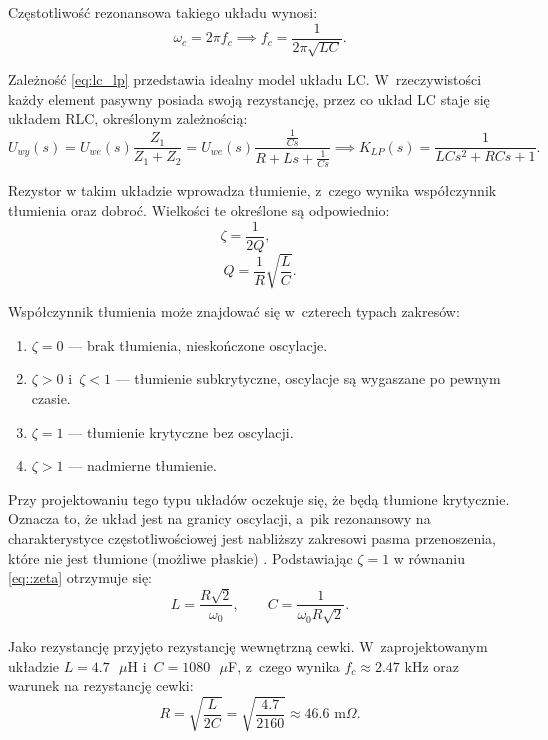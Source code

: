 Częstotliwość rezonansowa takiego układu wynosi:
\begin{equation}
    \omega_c = 2\pi f_c \implies f_c = \frac{1}{2\pi\sqrt{LC}}.
\end{equation}

Zależność \ref{eq:lc_lp} przedstawia idealny model układu LC. W~rzeczywistości
każdy element pasywny posiada swoją rezystancję, przez co układ LC staje się
układem RLC, określonym zależnością:
\begin{equation}
    U_{wy}(s) = U_{we}(s) \frac{Z_1}{Z_1 + Z_2} = U_{we}(s)\frac{\frac{1}{Cs}}{R + Ls + \frac{1}{Cs}}
        \implies K_{LP}(s) = \frac{1}{LCs^2 + RCs + 1}.
    \label{eq:lc_lp}
\end{equation}

Rezystor w takim układzie wprowadza tłumienie, z~czego wynika współczynnik
tłumienia oraz dobroć. Wielkości te określone są odpowiednio:
\begin{equation}
    \zeta = \frac{1}{2Q}, \qquad
    \label{eq::zeta}
\end{equation}
\begin{equation}
    Q = \frac{1}{R}\sqrt{\frac{L}{C}}.
\end{equation}

Współczynnik tłumienia może znajdować się w~czterech typach zakresów:
\begin{enumerate}
    \item $\zeta = 0$ --- brak tłumienia, nieskończone oscylacje.
    \item $\zeta > 0$ i~$\zeta < 1$ --- tłumienie subkrytyczne, oscylacje są
    wygaszane po pewnym czasie.
    \item $\zeta = 1$ --- tłumienie krytyczne bez oscylacji.
    \item $\zeta > 1$ --- nadmierne tłumienie.
\end{enumerate}

Przy projektowaniu tego typu układów oczekuje się, że będą tłumione krytycznie.
Oznacza to, że układ jest na granicy oscylacji, a~pik rezonansowy na
charakterystyce częstotliwościowej jest nabliższy zakresowi pasma przenoszenia,
które nie jest tłumione (możliwe płaskie) \cite{bib:lc}. Podstawiając $\zeta =
1$ w równaniu \ref{eq::zeta} otrzymuje się:
\begin{equation}
    L = \frac{R\sqrt{2}}{\omega_0}, \qquad 
    C = \frac{1}{\omega_0 R\sqrt{2}}.
\end{equation}

Jako rezystancję przyjęto rezystancję wewnętrzną cewki. W~zaprojektowanym
układzie $L = 4.7 \text{ }\mu$H i~$C = 1080 \text{ }\mu$F, z~czego wynika $f_c
\approx 2.47$ kHz oraz warunek na rezystancję cewki:
\begin{equation}
    R = \sqrt{\frac{L}{2C}} = \sqrt{\frac{4.7}{2160}} \approx 46.6 \text{ m}\Omega.
\end{equation}

